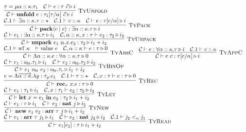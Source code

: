 \documentclass[fleqn]{article}
\begin{document}
\[\begin{array}{l}
    \infer[\textsc{TyUnfold}]{\mathcal{C} \vdash \mathbf{unfold}~e : \tau_1[\tau/\alpha]~\vec{c} \triangleright i}{\tau = \mu \alpha :: \kappa. \tau_1 & \mathcal{C} \vdash e : \tau~\vec{c} \triangleright i} \\
    \infer[\textsc{TyPack}]{\mathcal{C} \vdash \mathbf{pack}\langle c \mid e \rangle : \exists \alpha :: \kappa. \tau \triangleright i}{\mathcal{C}.1 \vdash \exists \alpha :: \kappa. \tau :: \star & \mathcal{C}.1 \vdash c :: \kappa & \mathcal{C} \vdash e : \tau[c/\alpha] \triangleright i} \\
    \infer[\textsc{TyUnpack}]{\mathcal{C} \vdash \mathbf{unpack}~e_1~\alpha.x.e_2 : \tau_2 \triangleright i_1 + i_2}{\mathcal{C} \vdash e_1 : \exists \alpha :: \kappa. \tau \triangleright i_1 & \mathcal{C},\alpha::\kappa,x:\tau \vdash e_2 : \tau_2 \triangleright i_2} \\
    \infer[\textsc{TyAbsC}]{\mathcal{C} \vdash \Lambda \alpha :: \kappa. e : \forall \alpha :: \kappa. \tau \triangleright 0}{\mathcal{C}.1 \vdash \mathrm{wf}~\kappa & \vdash \mathrm{value}~e & \mathcal{C},\alpha :: \kappa \vdash e : \tau \triangleright 0} \hspace{1em}
    \infer[\textsc{TyAppC}]{\mathcal{C} \vdash e~c : \tau[c/\alpha] \triangleright i}{\mathcal{C} \vdash e : \forall \alpha :: \kappa. \tau \triangleright i & \mathcal{C}.1 \vdash c :: \kappa} \\
    \infer[\textsc{TyBinOp}]{\mathcal{C} \vdash e_1~o_{bt}~e_2 : o_{bt}.\tau_r \triangleright i_1 + i_2}{\mathcal{C} \vdash e_1 : o_{bt}.\tau_1 \triangleright i_1 & \mathcal{C} \vdash e_2 : o_{bt}.\tau_2 \triangleright i_2} \\
    \infer[\textsc{TyRec}]{\mathcal{C} \vdash \mathbf{rec}_\tau~x. e : \tau \triangleright 0}{e = \Lambda \overrightarrow{\alpha :: \kappa}. \lambda y : \tau_y. e_1 & \mathcal{C}.1 \vdash \tau :: \star & \mathcal{C},x:\tau \vdash e : \tau \triangleright 0} \\
    \infer[\textsc{TyLet}]{\mathcal{C} \vdash \mathbf{let}~x=e_1~\mathbf{in}~e_2 : \tau_2 \triangleright i_1 + i_2}{\mathcal{C} \vdash e_1 : \tau_1 \triangleright i_1 & \mathcal{C},x:\tau_1 \vdash e_2 : \tau_2 \triangleright i_2} \\
    \infer[\textsc{TyNew}]{\mathcal{C} \vdash \mathbf{new}~e_1~e_2 : \mathbf{arr}~\tau~j \triangleright i_1 + i_2}{\mathcal{C} \vdash e_1 : \tau \triangleright i_1 & \mathcal{C} \vdash e_2 : \mathbf{nat}~j \triangleright i_2} \\
    \infer[\textsc{TyRead}]{\mathcal{C} \vdash e_1[e_2] : \tau \triangleright i_1 + i_2}{\mathcal{C} \vdash e_1 : \mathbf{arr}~\tau~j_1 \triangleright i_1 & \mathcal{C} \vdash e_2 : \mathbf{nat}~j_2 \triangleright i_2 & \mathcal{C}.1 \vdash j_2 <_n j_1} \\

\end{array}\]
\end{document}
